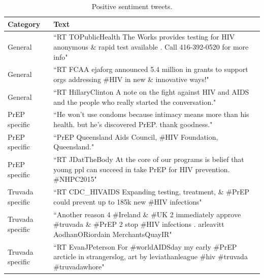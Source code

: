 \documentclass{sig-alternate-05-2015}
\begin{document}
\begin{table}
\centering
\caption{Positive sentiment tweets.}
\begin{tabular}{|p{2.5cm}|p{12cm}|} \hline
Category & Text\\ \hline
General & ``RT TOPublicHealth The Works provides testing for HIV anonymous \& rapid test available . Call 416-392-0520 for more info"\\ \hline
General & ``RT FCAA ejaforg announced 5.4 million in grants to support orgs addressing \#HIV in new \& innovative ways!"\\ \hline
General & ``RT HillaryClinton A note on the fight against HIV and AIDS and the people who really started the conversation."\\ \hline

PrEP specific & ``He won't use condoms because intimacy means more than his health. but he's discovered PrEP. thank goodness."\\ \hline
PrEP specific & ``PrEP Queensland Aids Council, \#HIV Foundation, Queensland."\\ \hline
PrEP specific & ``RT JDatTheBody At the core of our programs is belief that young ppl can succeed in take PrEP for HIV prevention. \#NHPC2015"\\ \hline

Truvada specific & ``RT CDC\_HIVAIDS Expanding testing, treatment, \& \#PrEP could prevent up to 185k new \#HIV infections"\\ \hline
Truvada specific & ``Another reason 4 \#Ireland \& \#UK 2 immediately approve \#truvada \& \#PrEP 2 stop \#HIV infections . arleavitt AodhanORiordain MerchantsQuayIR"\\ \hline
Truvada specific & ``RT EvanJPeterson For \#worldAIDSday my early \#PrEP arcticle in strangerslog, art by leviathanleague \#hiv \#truvada \#truvadawhore"\\ \hline

\hline\end{tabular}
\end{table}
\end{document}
